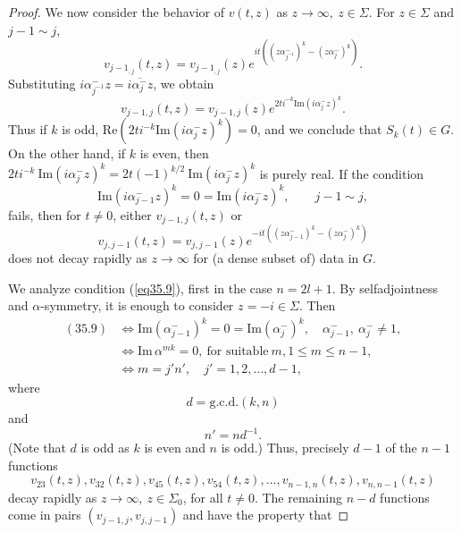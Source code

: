 \documentclass{surv-l}
\theoremstyle{plain}
\theoremstyle{definition}
\numberwithin{equation}{chapter}
\begin{document}
\begin{proof}
We now consider the behavior of $v(t, z)$ as $ z\rightarrow\infty,\  z\in\Sigma$. For $ z\in\Sigma$ and $ j-1\sim j$,
\begin{equation*}
v_{j-1_{,j}}(t, z)=v_{j-1_{,j}}(z)e^{it((z\alpha_{j^{-1}}^{-})^{k}-(z\alpha_{j}^{-})^{k})}.
\end{equation*}
Substituting $i\alpha_{j^{-1}}^{-}z=\overline{i\alpha_{j}^{-}z}$, we obtain
\begin{equation*}
v_{j-1,j}(t, z)=v_{j-1,j}(z)e^{2ti^{-k}\mathrm{Im}(i\alpha_{j}^{-}z)^{k}}.
\end{equation*}
Thus if $k$ is odd, $\mathrm{Re}(2ti^{-k}\mathrm{Im}(i\alpha_{j}^{-}z)^{k})=0$, and we conclude that $S_{k}(t)\in G$. On the other hand, if $k$ is even, then $2ti^{-k}\ \mathrm{Im}(i\alpha_{j}^{-}z)^{k}=2t(-1)^{k/2}\ \mathrm{Im}(i\alpha_{j}^{-}z)^{k}$ is purely real. If the condition
\setcounter{equation}{8}
\begin{equation}\label{eq35.9}
\mathrm{Im}(i\alpha_{j-1}^{-}z)^{k}=0=\mathrm{Im}(i\alpha_{j}^{-}z)^{k},\qquad j-1\sim j,
\end{equation}
fails, then for $t\neq 0$, either $v_{j-1,j}(t, z)$ or
\begin{equation*}
v_{j,j-1}(t, z)=v_{j,j-1    }(z)e^{{-it( (z\alpha_{j-1}^{-})^{k}-(z\alpha_{j}^{-})^{k})}}
\end{equation*}
does not decay rapidly as $z \rightarrow\infty$ for (a dense subset of) data in $G$.

We analyze condition (\ref{eq35.9}), first in the case $n=2l+1$. By selfadjointness and $\alpha$-symmetry, it is enough to consider $ z=-i\in\Sigma$. Then
\begin{align*}
(35.9)&\Leftrightarrow\mathrm{Im}(\alpha_{j-1}^{-})^{k}=0=\mathrm{Im}(\alpha_{j}^{-})^{k},\quad \alpha_{j-1}^{-},\ \alpha_{j}^{-}\neq 1,\\
&\Leftrightarrow\mathrm{Im}\,\alpha^{mk}=0,\ \text{for suitable}\ m,1\leq m\leq n-1,\\
&\Leftrightarrow m=j'n',\quad j'=1,2,\ldots,d-1,
\end{align*}
where
\begin{equation}\label{eq35.10}
d=\mathrm{g.c.d.}(k, n)
\end{equation}
and
\begin{equation}\label{eq35.11}
n'=nd^{-1}.
\end{equation}
(Note that $d$ is odd as $k$ is even and $n$ is odd.) Thus, precisely $d-1$ of the $n-1$ functions
\begin{equation*}
v_{23}(t, z),v_{32}(t,z),v_{45}(t, z),v_{54}(t, z),\ldots,v_{n-1,n}(t,z),v_{n,n-1}(t, z)
\end{equation*}
decay rapidly as $ z\rightarrow\infty,\ z\in\Sigma_{0}$, for all $t\neq 0$. The remaining $n-d$ functions come in pairs $(v_{j-1,j},v_{j,j-1})$ and have the property that


\end{proof}
\end{document}
